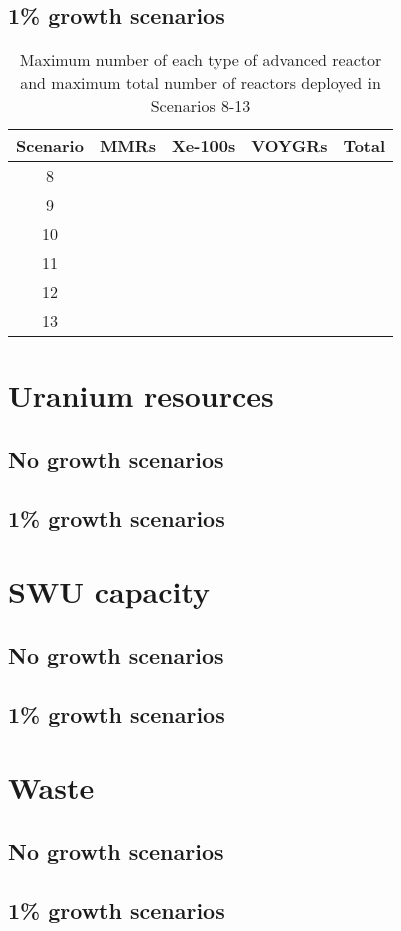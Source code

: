 \subsection{1\% growth scenarios}

\begin{table}
    \centering 
    \caption{Maximum number of each type of advanced reactor and maximum total 
    number of reactors deployed in Scenarios 8-13}
    \label{tab:reactors_1growth}
    \begin{tabular}{c c c c c}
        \hline
        Scenario & \glspl{MMR} & Xe-100s & VOYGRs & Total\\\hline
        8 & \\
        9 & \\
        10 & \\
        11 & \\
        12 & \\
        13 & \\
        \hline
    \end{tabular}
\end{table}

\section{Uranium resources}

\subsection{No growth scenarios}

\subsection{1\% growth scenarios}

\section{SWU capacity}
\subsection{No growth scenarios}

\subsection{1\% growth scenarios}

\section{Waste}
\subsection{No growth scenarios}

\subsection{1\% growth scenarios}